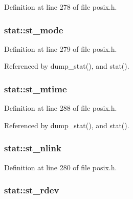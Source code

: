 Definition at line 278 of file posix.\-h.

\hypertarget{structstat_a5cbdd829011af82ba61e83773bbcbc7d}{
\subsubsection[{st\-\_\-mode}]{ stat\-::st\-\_\-mode}}\label{structstat_a5cbdd829011af82ba61e83773bbcbc7d}


Definition at line 279 of file posix.\-h.



Referenced by dump\-\_\-stat(), and stat().

\hypertarget{structstat_a77e235090f8cb6897f1c0ce65689006b}{
\subsubsection[{st\-\_\-mtime}]{ stat\-::st\-\_\-mtime}}\label{structstat_a77e235090f8cb6897f1c0ce65689006b}


Definition at line 288 of file posix.\-h.



Referenced by dump\-\_\-stat(), and stat().

\hypertarget{structstat_a0ed9092fa6c77a3251b9b9a4738ef84f}{
\subsubsection[{st\-\_\-nlink}]{ stat\-::st\-\_\-nlink}}\label{structstat_a0ed9092fa6c77a3251b9b9a4738ef84f}


Definition at line 280 of file posix.\-h.

\hypertarget{structstat_aa61e6c1a8a91c69f1d26f6700a0546cb}{
\subsubsection[{st\-\_\-rdev}]{ stat\-::st\-\_\-rdev}}\label{structstat_aa61e6c1a8a91c69f1d26f6700a0546cb}


